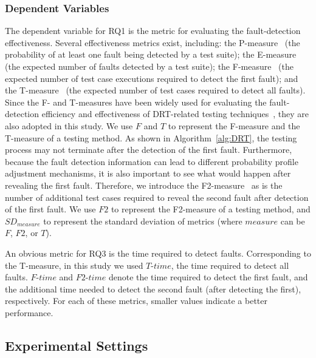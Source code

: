 \documentclass[10pt,journal,compsoc]{IEEEtran}
\begin{document}
\subsubsection{Dependent Variables}
\label{sec:dependentvariables}

The dependent variable for RQ1 is the metric for evaluating the fault-detection effectiveness.
Several effectiveness metrics exist, including:
the P-measure~\cite{duran1984evaluation} (the probability of at least one fault being detected by a test suite);
the E-measure~\cite{chen1997optimal} (the expected number of faults detected by a test suite);
the F-measure~\cite{sun2018adaptive} (the expected number of test case executions required to detect the first fault); and
the T-measure~\cite{zhang2014history} (the expected number of test cases required to detect all faults).
Since the F- and T-measures have been widely used for evaluating the fault-detection efficiency and effectiveness of DRT-related testing techniques~\cite{Cai07, cai2009random, Lv2011, Yang2014Dynamic, li2015, zhang2014history}, they are also adopted in this study.
We use $F$ and $T$ to represent the F-measure and the T-measure of a testing method.
As shown in Algorithm~\ref{alg:DRT}, the testing process may not terminate after the detection of the first fault.
Furthermore, because the fault detection information can lead to different probability profile adjustment mechanisms, it is also important to see what would happen after revealing the first fault.
Therefore, we introduce the F2-measure~\cite{sun2018adaptive} as is the number of additional test cases required to reveal the second fault after detection of the first fault.
We use $F2$ to represent the F2-measure of a testing method, and $SD_{measure}$ to represent the standard deviation of metrics (where $measure$ can be $F$, $F2$, or $T$).

An obvious metric for RQ3 is the time required to detect faults.
Corresponding to the T-measure, in this study we used $T$-$time$, the time required to detect all faults.
$F$-$time$ and $F2$-$time$ denote the time required to detect the first fault, and the additional time needed to detect the second fault (after detecting the first), respectively.
For each of these metrics, smaller values indicate a better performance.

\subsection{Experimental Settings}
\label{sec:settings}
\end{document}
